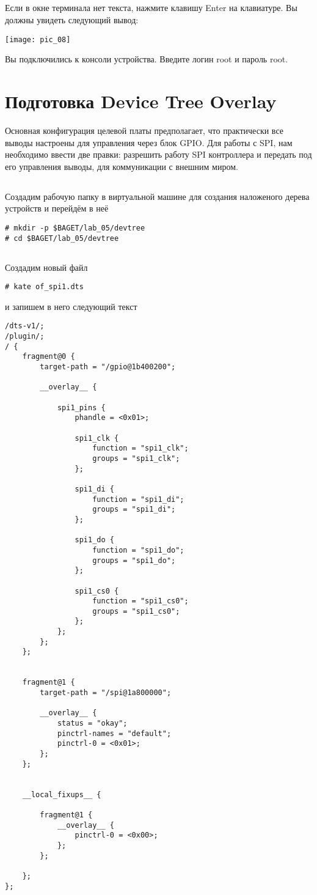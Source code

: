 \subsection{}Если в окне терминала нет текста, нажмите клавишу Enter на клавиатуре. Вы должны увидеть следующий вывод:
\begin{center}
	\texttt{[image: pic\_08]}
\end{center}
Вы подключились к консоли устройства. Введите логин root и пароль root.


\section{Подготовка Device Tree Overlay}
Основная конфигурация целевой платы предполагает, что практически все выводы настроены для управления через блок GPIO. Для работы с SPI, нам необходимо ввести две правки: разрешить работу SPI контроллера и передать под его управления выводы, для коммуникации с внешним миром. 

\subsection{} Создадим рабочую папку в виртуальной машине для создания наложеного дерева устройств и перейдём в неё 
\begin{lstlisting}[style=bash]
# mkdir -p $BAGET/lab_05/devtree
# cd $BAGET/lab_05/devtree
\end{lstlisting}

\subsection{}Создадим новый файл
\begin{lstlisting}[style=bash]
# kate of_spi1.dts
\end{lstlisting}
и запишем в него следующий текст
\begin{lstlisting}[style=stdout]
/dts-v1/;
/plugin/;
/ {
	fragment@0 {
		target-path = "/gpio@1b400200";
		
		__overlay__ {
			
			spi1_pins {
				phandle = <0x01>;
				
				spi1_clk {
					function = "spi1_clk";
					groups = "spi1_clk";
				};
				
				spi1_di {
					function = "spi1_di";
					groups = "spi1_di";
				};
				
				spi1_do {
					function = "spi1_do";
					groups = "spi1_do";
				};
				
				spi1_cs0 {
					function = "spi1_cs0";
					groups = "spi1_cs0";
				};
			};
		};
	};
	
	
	fragment@1 { 
		target-path = "/spi@1a800000"; 
		
		__overlay__ { 
			status = "okay"; 
			pinctrl-names = "default"; 
			pinctrl-0 = <0x01>; 
		}; 
	}; 
	
	
	__local_fixups__ {
		
		fragment@1 {
			__overlay__ {
				pinctrl-0 = <0x00>;
			};
		};
		
	};
};
\end{lstlisting}

